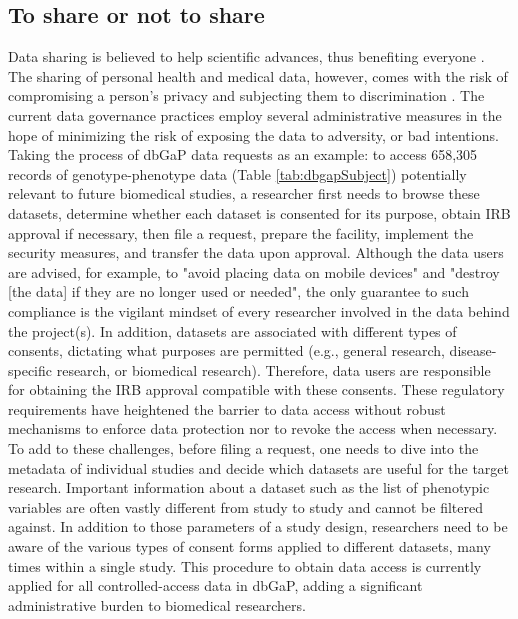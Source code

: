 \documentclass[letter]{bioinfo}
\begin{document}
	
	\subsection*{To share or not to share}
	Data sharing is believed to help scientific advances, thus benefiting everyone \citep{GA4GH:2014:Framework}. The sharing of personal health and medical data, however, comes with the risk of compromising a person's privacy and subjecting them to discrimination \citep{P3gConsortium:2009:Public,GA4GH:2014:Framework,Shringarpure:2015:Privacy}.  The current data governance practices employ several administrative measures in the hope of minimizing the risk of exposing the data to adversity, or bad intentions. Taking the process of dbGaP data requests as an example: to access 658,305 records of genotype-phenotype data (Table \ref{tab:dbgapSubject}) potentially relevant to future biomedical studies, a researcher first needs to browse these datasets, determine whether each dataset is consented for its purpose, obtain IRB approval if necessary, then file a request, prepare the facility, implement the security measures, and transfer the data upon approval. Although the data users are advised, for example, to "avoid placing data on mobile devices" and "destroy [the data] if they are no longer used or needed", the only guarantee to such compliance is the vigilant mindset of every researcher involved in the data behind the project(s).  In addition, datasets are associated with different types of consents, dictating what purposes are permitted (e.g., general research, disease-specific research, or biomedical research). Therefore, data users are responsible for obtaining the IRB approval compatible with these consents. These regulatory requirements have heightened the barrier to data access without robust mechanisms to enforce data protection nor to revoke the access when necessary.  To add to these challenges, before filing a request, one needs to dive into the metadata of individual studies and decide which datasets are useful for the target research. Important information about a dataset such as the list of phenotypic variables are often vastly different from study to study and cannot be filtered against. In addition to those parameters of a study design, researchers need to be aware of the various types of consent forms applied to different datasets, many times within a single study. This procedure to obtain data access is currently applied for all controlled-access data in dbGaP, adding a significant administrative burden to biomedical researchers.
\end{document}
